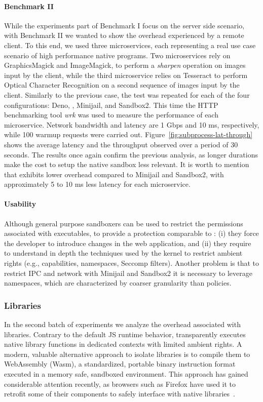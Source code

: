 \paragraph{Benchmark II}
%
While the experiments part of Benchmark I focus on the server side
scenario, with Benchmark II we wanted to show the overhead experienced
by a remote client. To this end, we used three microservices,
each representing a real use case scenario of high performance native
programs. Two microservices rely on GraphicsMagick and ImageMagick, to
perform a {\em sharpen} operation on images input by the client, while
the third microservice relies on Tesseract to perform Optical
Character Recognition on a second sequence of images input by the
client. Similarly to the previous case, the test was repeated for each
of the four configurations: Deno, \pap, Minijail, and Sandbox2. This
time the HTTP benchmarking tool {\em wrk} was used to measure the
performance of each microservice.  Network bandwidth and latency are 1
Gbps and 10 ms, respectively, while 100 warmup requests were carried
out. Figure~\ref{fig:subprocess-lat-through} shows the average latency
and the throughput observed over a period of 30 seconds. The results
once again confirm the previous analysis, as longer durations make the
cost to setup the native sandbox less relevant. It is worth to mention
that \pap exhibits lower overhead compared to Minijail and Sandbox2,
with approximately 5 to 10 ms less latency for each microservice.


\paragraph{Usability}
%
Although general purpose sandboxers can be used to restrict the
permissions associated with executables, to provide a protection
comparable to \pap: (i) they force the developer to introduce changes in
the web application, and (ii) they require to understand in depth the
techniques used by the kernel to restrict ambient rights (e.g.,
capabilities, namespaces, Seccomp filters). Another problem is that to
restrict IPC and network with Minijail and Sandbox2 it is necessary to
leverage namespaces, which are characterized by coarser granularity
than \pap policies.



\subsubsection{Libraries}

In the second batch of experiments we analyze the overhead associated
with libraries. Contrary to the default JS runtime behavior, \pap
transparently executes native library functions in dedicated contexts
with limited ambient rights. A modern, valuable alternative approach
to isolate libraries is to compile them to WebAssembly (Wasm), a
standardized, portable binary instruction format executed in a memory
safe, sandboxed environment. This approach has gained considerable
attention recently, as browsers such as Firefox have used it to
retrofit some of their components to safely interface with native
libraries~\cite{RLBox}.

